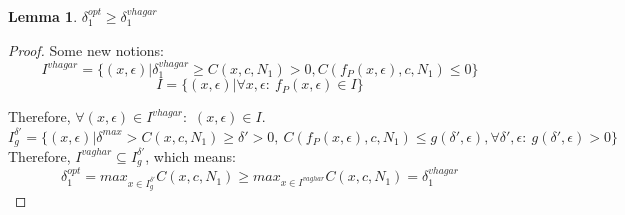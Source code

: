\begin{comment}
\documentclass[11pt]{article}
\usepackage[a4paper, portrait, margin=1in]{geometry}
\usepackage{graphicx}
\usepackage{hyperref}
\usepackage{caption}
\usepackage[labelformat=simple]{subcaption}    %
\renewcommand{\thesubfigure}{\normalsize Figure \thefigure. (\alph{subfigure}):}
\usepackage{cjhebrew}
\usepackage{float}
\usepackage{eldar_report}
\usepackage{amsmath}
\usepackage{amsfonts}
\newcommand\normx[1]{\Vert#1\Vert}
\usepackage{graphicx}
\usepackage{enumitem}
\usepackage{lifetime}
\usepackage{booktabs}
\usepackage{makecell}
\usepackage{graphicx}
\usepackage{multirow}
\usepackage{comment}
\usepackage{array}
\usepackage[english]{babel}
\usepackage{amsthm}
\usepackage{float}
\newcommand{\Dana}[1]{\textcolor{purple}{\bf Dana: #1}}
\newcommand{\Neta}[1]{\textcolor{purple}{\bf Neta: #1}}


\end{comment}

\newtheorem{theorem}{Theorem}[section]
\newtheorem{lemma}[theorem]{Lemma}

\begin{lemma}
$\delta_1^{opt} \geq \delta^{vhagar}_1$
\end{lemma}
\begin{proof}
Some new notions:
$$I^{vhagar} = \{(x,\epsilon)|\delta_1^{vhagar} \geq C(x,c,N_1) > 0 , C(f_P(x,\epsilon),c,N_1)\leq 0 \}$$
$$I = \{(x,\epsilon)|\forall{x,\epsilon}:\ f_P(x,\epsilon)\in{I}\}$$

Therefore, $\forall{(x,\epsilon)}\in{I^{vhagar}}:$ $(x,\epsilon)\in{I}$.%
$$I^{\delta'}_g = \{(x,\epsilon)|\delta^{max}> C(x,c,N_1) \geq \delta' > 0 ,\ C(f_P(x,\epsilon),c,N_1)\leq g(\delta',\epsilon), \forall{\delta',\epsilon}:\ g(\delta',\epsilon)>0 \} $$
Therefore, $I^{vaghar}\subseteq{I^{\delta'}_g}$, which means:
$$ \delta_1^{opt}=max_{x\in{I^{\delta'}_g}}{C(x,c,N_1)} \geq max_{x\in{I^{vaghar}}}{C(x,c,N_1)}=\delta_1^{vhagar}$$
\end{proof}

